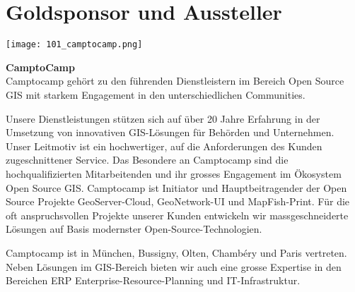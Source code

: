 \section*{Goldsponsor und Aussteller}
  \texttt{[image: 101\_camptocamp.png]}
  \vspace{1.0\baselineskip}
  
\noindent
    {\bfseries CamptoCamp}\\
    Camptocamp gehört zu den führenden Dienstleistern im Bereich Open Source GIS mit starkem Engagement in den unterschiedlichen Communities.

 \noindent   
Unsere Dienstleistungen stützen sich auf über 20 Jahre Erfahrung in der Umsetzung von innovativen GIS-Lösungen für Behörden und Unternehmen. Unser Leitmotiv ist ein hochwertiger, auf die Anforderungen des Kunden zugeschnittener Service. Das Besondere an Camptocamp sind die hochqualifizierten Mitarbeitenden und ihr grosses Engagement im Ökosystem Open Source GIS. Camptocamp ist Initiator und Hauptbeitragender der Open Source Projekte GeoServer-Cloud, GeoNetwork-UI und MapFish-Print. Für die oft anspruchsvollen Projekte unserer Kunden entwickeln wir massgeschneiderte Lösungen auf Basis modernster Open-Source-Technologien.

 \noindent   
Camptocamp ist in München, Bussigny, Olten, Chambéry und Paris vertreten. Neben Lösungen im GIS-Bereich bieten wir auch eine grosse Expertise in den Bereichen ERP Enterprise-Resource-Planning und IT-Infrastruktur.
